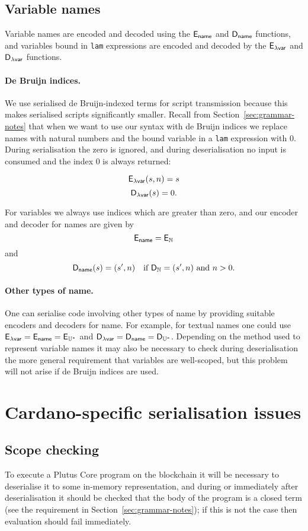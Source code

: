 \subsection{Variable names}
Variable names are encoded and decoded using the $\mathsf{E}_{\mathsf{name}}$ and $\mathsf{D}_{\mathsf{name}}$
functions, and variables bound in \texttt{lam} expressions are encoded and
decoded by the $\mathsf{E}_{\mathsf{\text{$\lambda$}var}}$ and $\mathsf{D}_{\mathsf{\text{$\lambda$}var}}$ functions.

\paragraph{De Bruijn indices.}
We use serialised de Bruijn-indexed terms for script transmission because
this makes serialised scripts significantly smaller.  Recall from
Section~\ref{sec:grammar-notes} that when we want to use our syntax with de
Bruijn indices we replace names with natural numbers and the bound variable in a
\texttt{lam} expression with 0.  During serialisation the zero is ignored, and
during deserialisation no input is consumed and the index 0 is always returned:

$$
\mathsf{E}_{\mathsf{\text{$\lambda$}var}}(s, n) = s
$$
$$
\mathsf{D}_{\mathsf{\text{$\lambda$}var}}(s) = 0.
$$

\noindent For variables we always use indices which are greater than zero, and our
encoder and decoder for names are given by
$$
\mathsf{E}_{\mathsf{name}} = \mathsf{E}_{\mathbb{N}}
$$
and
$$
\mathsf{D}_{\mathsf{name}} (s) = (s', n) \quad \text{if $\mathsf{D}_{\mathbb{N}} = (s', n)$ and $n>0$}.
$$


\paragraph{Other types of name.}
One can serialise code involving other types of name by providing suitable
encoders and decoders for name.  For example, for textual names one could use
$\mathsf{E}_{\mathsf{\text{$\lambda$}var}} = \mathsf{E}_{\mathsf{name}} = \mathsf{E}_{\mathbb{U}^*}$ and $\mathsf{D}_{\mathsf{\text{$\lambda$}var}} = \mathsf{D}_{\mathsf{name}} = \mathsf{D}_{\mathbb{U}^*}$.  Depending
on the method used to represent variable names it may also be necessary to check
during deserialisation the more general requirement that variables are
well-scoped, but this problem will not arise if de Bruijn indices are used.

\section{Cardano-specific serialisation issues}
\label{sec:cardano-issues}
\subsection{Scope checking}
To execute a Plutus Core program on the blockchain it will be necessary to
deserialise it to some in-memory representation, and during or immediately after
deserialisation it should be checked that the body of the program is a closed
term (see the requirement in Section~\ref{sec:grammar-notes}); if this is not
the case then evaluation should fail immediately.

